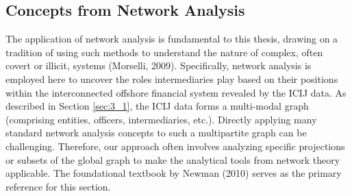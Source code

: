 \subsection{Concepts from Network Analysis}
\label{subsec:network_theory_concepts}

The application of network analysis is fundamental to this thesis, drawing on a tradition of using such methods to understand the nature of complex, often covert or illicit, systems (Morselli, 2009). Specifically, network analysis is employed here to uncover the roles intermediaries play based on their positions within the interconnected offshore financial system revealed by the ICIJ data. As described in Section \ref{sec:3_1}, the ICIJ data forms a multi-modal graph (comprising entities, officers, intermediaries, etc.). Directly applying many standard network analysis concepts to such a multipartite graph can be challenging. Therefore, our approach often involves analyzing specific projections or subsets of the global graph to make the analytical tools from network theory applicable. The foundational textbook by Newman (2010) serves as the primary reference for this section.

